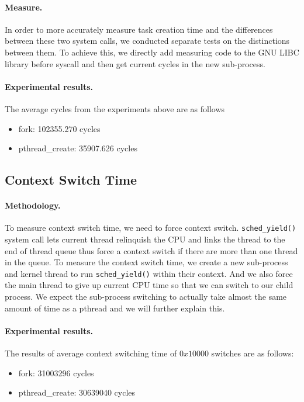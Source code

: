 \paragraph{Measure.} In order to more accurately measure task creation time and the differences between these two system calls, we conducted separate tests on the distinctions between them. To achieve this, we directly add measuring code to the GNU LIBC library before syscall and then get current cycles in the new sub-process. 
\paragraph{Experimental results.}
The average cycles from the experiments above are as follows
\begin{itemize}[leftmargin=*]
	\item fork: 102355.270 cycles
	\item pthread\_create: 35907.626 cycles
\end{itemize}

\subsection{Context Switch Time}
\paragraph{Methodology.} To measure context switch time, we need to force context switch. \texttt{sched\_yield()} system call lets current thread relinquish the CPU and links the thread to the end of thread queue thus force a context switch if there are more than one thread in the queue. To measure the context switch time, we create a new sub-process and kernel thread to run \texttt{sched\_yield()} within their context. And we also force the main thread to give up current CPU time so that we can switch to our child process. We expect the sub-process switching to actually take almost the same amount of time as a pthread and we will further explain this.

\paragraph{Experimental results.}
The results of average context switching time of $0x10000$ switches are as follows:
\begin{itemize}[leftmargin=*]
	\item fork: 31003296 cycles
	\item pthread\_create: 30639040 cycles
\end{itemize}

